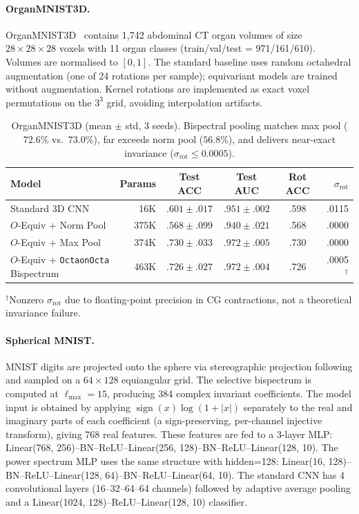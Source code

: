 \documentclass{article}
\theoremstyle{definition}
\theoremstyle{remark}
\theoremstyle{definition}
\begin{document}
\paragraph{OrganMNIST3D.}
OrganMNIST3D~\citep{medmnistv2} contains 1{,}742 abdominal CT organ
volumes of size $28 \times 28 \times 28$ voxels with 11 organ classes
(train/val/test = 971/161/610). Volumes are normalised to $[0, 1]$.
The standard baseline uses random octahedral augmentation (one of 24
rotations per sample); equivariant models are trained without
augmentation. Kernel rotations are implemented as exact voxel
permutations on the $3^3$ grid, avoiding interpolation artifacts.

\begin{table}[h]
  \caption{OrganMNIST3D (mean $\pm$ std, 3 seeds). Bispectral pooling
    matches max pool ($72.6\%$ vs.\ $73.0\%$), far exceeds norm pool
    ($56.8\%$), and delivers near-exact invariance
    ($\sigma_{\mathrm{rot}} \le 0.0005$).}
  \label{tab:organ3d-results}
  \centering
  \small
  \begin{tabular}{lrcccr}
    \toprule
    Model & Params & Test ACC & Test AUC & Rot ACC & $\sigma_{\mathrm{rot}}$ \\
    \midrule
    Standard 3D CNN          & 16K  & $.601 \pm .017$ & $.951 \pm .002$ & .598 & .0115 \\
    $O$-Equiv + Norm Pool    & 375K & $.568 \pm .099$ & $.940 \pm .021$ & .568 & .0000 \\
    $O$-Equiv + Max Pool     & 374K & $.730 \pm .033$ & $.972 \pm .005$ & .730 & .0000 \\
    $O$-Equiv + \texttt{OctaonOcta} Bispectrum   & 463K & $.726 \pm .027$ & $.972 \pm .004$ & .726 & .0005$^\dagger$ \\
    \bottomrule
  \end{tabular}

  \vspace{0.3em}
  {\small $^\dagger$Nonzero $\sigma_{\mathrm{rot}}$ due to floating-point precision in CG contractions, not a theoretical invariance failure.}
\end{table}


\paragraph{Spherical MNIST.}
MNIST digits are projected onto the sphere via stereographic
projection following \citet{cohen2018spherical} and sampled on a
$64 \times 128$ equiangular grid. The selective bispectrum is
computed at $\ell_{\max} = 15$, producing 384 complex invariant
coefficients. The model input is obtained by applying
$\operatorname{sign}(x)\log(1+|x|)$ separately to the real and
imaginary parts of each coefficient (a sign-preserving, per-channel
injective transform), giving 768 real features. These features are
fed to a 3-layer MLP: Linear(768, 256)--BN--ReLU--Linear(256,
128)--BN--ReLU--Linear(128, 10). The power spectrum MLP uses the
same structure with hidden=128: Linear(16, 128)--BN--ReLU--Linear(128,
64)--BN--ReLU--Linear(64, 10). The standard CNN has 4 convolutional
layers (16--32--64--64 channels) followed by adaptive average pooling
and a Linear(1024, 128)--ReLU--Linear(128, 10) classifier.
\end{document}
